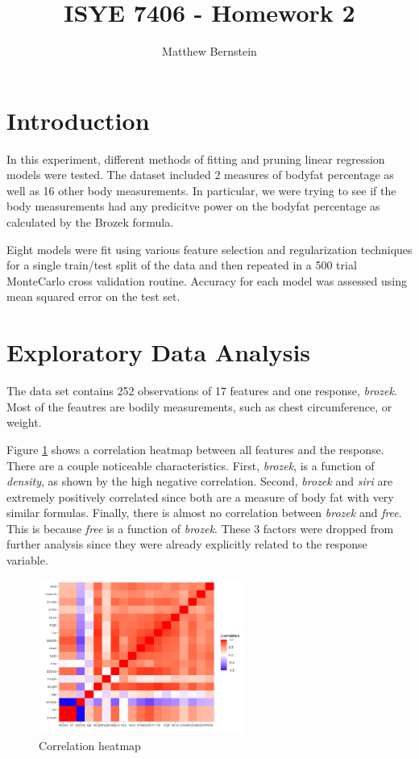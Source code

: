 \documentclass[12pt,letterpaper]{article}
\title{ISYE 7406 - Homework 2}
\author{Matthew Bernstein}
\begin{document}
\maketitle
\section*{Introduction}

In this experiment, different methods of fitting and pruning linear regression models were tested. The dataset included 2 measures of bodyfat percentage as well as 16 other body measurements. In particular, we were trying to see if the body measurements had any predicitve power on the bodyfat percentage as calculated by the Brozek formula.

Eight models were fit using various feature selection and regularization techniques for a single train/test split of the data and then repeated in a 500 trial MonteCarlo cross validation routine. Accuracy for each model was assessed using mean squared error on the test set. 

\section*{Exploratory Data Analysis}

The data set contains 252 observations of 17 features and one response, \textit{brozek}. Most of the feautres are bodily measurements, such as chest circumference, or weight. 

Figure \ref{fig:cor} shows a correlation heatmap between all features and the response. There are a couple noticeable characteristics. First, \textit{brozek}, is a function of \textit{density}, as shown by the high negative correlation. Second, \textit{brozek} and \textit{siri} are extremely positively correlated since both are a measure of body fat with very similar formulas. Finally, there is almost no correlation between \textit{brozek} and \textit{free}. This is because \textit{free} is a function of \textit{brozek}. These 3 factors were dropped from further analysis since they were already explicitly related to the response variable. 

\begin{figure}[!htb]
  \centering
  \includegraphics[width=0.6\textwidth]{cor_heatmap}
  \caption{Correlation heatmap}
  \label{fig:cor}
\end{figure}
\end{document}
